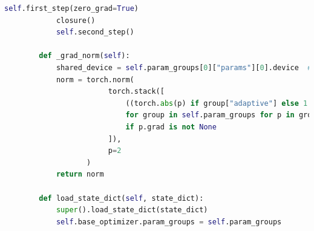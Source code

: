 \documentclass[twocolumn]{article}
\begin{document}
\begin{lstlisting}[language=Python, caption=SAM Optimizer Code]
            self.first_step(zero_grad=True)
            closure()
            self.second_step()
    
        def _grad_norm(self):
            shared_device = self.param_groups[0]["params"][0].device  # put everything on the same device, in case of model parallelism
            norm = torch.norm(
                        torch.stack([
                            ((torch.abs(p) if group["adaptive"] else 1.0) * p.grad).norm(p=2).to(shared_device)
                            for group in self.param_groups for p in group["params"]
                            if p.grad is not None
                        ]),
                        p=2
                   )
            return norm
    
        def load_state_dict(self, state_dict):
            super().load_state_dict(state_dict)
            self.base_optimizer.param_groups = self.param_groups
    
\end{lstlisting}


\end{document}
